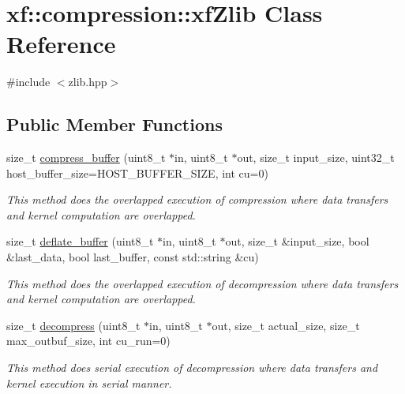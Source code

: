 \hypertarget{classxf_1_1compression_1_1xfZlib}{\section{xf\-:\-:compression\-:\-:xf\-Zlib Class Reference}
\label{classxf_1_1compression_1_1xfZlib}
}


{\ttfamily \#include $<$zlib.\-hpp$>$}

\subsection*{Public Member Functions}
\begin{DoxyCompactItemize}
\item 
size\-\_\-t \hyperlink{classxf_1_1compression_1_1xfZlib_aac31d05070fc44eaa7b73e39d1e55387}{compress\-\_\-buffer} (uint8\-\_\-t $\ast$in, uint8\-\_\-t $\ast$out, size\-\_\-t input\-\_\-size, uint32\-\_\-t host\-\_\-buffer\-\_\-size=H\-O\-S\-T\-\_\-\-B\-U\-F\-F\-E\-R\-\_\-\-S\-I\-Z\-E, int cu=0)
\begin{DoxyCompactList}\small\item\em This method does the overlapped execution of compression where data transfers and kernel computation are overlapped. \end{DoxyCompactList}\item 
size\-\_\-t \hyperlink{classxf_1_1compression_1_1xfZlib_aa6fc980499fbe77fb8c760362140cc97}{deflate\-\_\-buffer} (uint8\-\_\-t $\ast$in, uint8\-\_\-t $\ast$out, size\-\_\-t \&input\-\_\-size, bool \&last\-\_\-data, bool last\-\_\-buffer, const std\-::string \&cu)
\begin{DoxyCompactList}\small\item\em This method does the overlapped execution of decompression where data transfers and kernel computation are overlapped. \end{DoxyCompactList}\item 
size\-\_\-t \hyperlink{classxf_1_1compression_1_1xfZlib_a5dc1443008daebba8e3aa47c1962434a}{decompress} (uint8\-\_\-t $\ast$in, uint8\-\_\-t $\ast$out, size\-\_\-t actual\-\_\-size, size\-\_\-t max\-\_\-outbuf\-\_\-size, int cu\-\_\-run=0)
\begin{DoxyCompactList}\small\item\em This method does serial execution of decompression where data transfers and kernel execution in serial manner. \end{DoxyCompactList}\item 

\end{DoxyCompactItemize}
